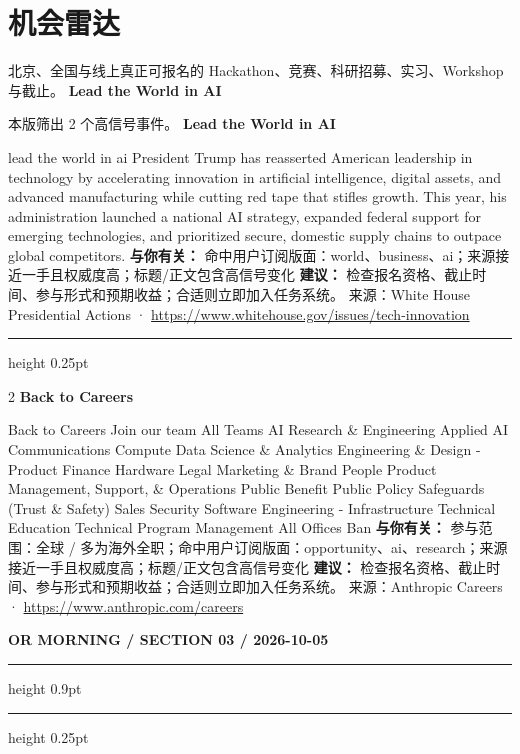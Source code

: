\documentclass[10.5pt]{ctexart}
\begin{document}
\section*{机会雷达}
{\color{ormuted} 北京、全国与线上真正可报名的 Hackathon、竞赛、科研招募、实习、Workshop 与截止。}
\vspace{2mm}
{\LARGE\bfseries Lead the World in AI}\par
\vspace{1mm}
{\color{ormuted} 本版筛出 2 个高信号事件。}
\vspace{3mm}
{\Large\bfseries Lead the World in AI}\par
lead the world in ai President Trump has reasserted American leadership in technology by accelerating innovation in artificial intelligence, digital assets, and advanced manufacturing while cutting red tape that stifles growth. This year, his administration launched a national AI strategy, expanded federal support for emerging technologies, and prioritized secure, domestic supply chains to outpace global competitors.
\textbf{与你有关：} 命中用户订阅版面：world、business、ai；来源接近一手且权威度高；标题/正文包含高信号变化
\textbf{建议：} 检查报名资格、截止时间、参与形式和预期收益；合适则立即加入任务系统。
{\footnotesize\color{ormuted} 来源：White House Presidential Actions · \url{https://www.whitehouse.gov/issues/tech-innovation}}
\vspace{4mm}
\hrule height 0.25pt
\vspace{3mm}
\begin{multicols}{2}
{\large\bfseries Back to Careers}\par
Back to Careers Join our team All Teams AI Research \& Engineering Applied AI Communications Compute Data Science \& Analytics Engineering \& Design - Product Finance Hardware Legal Marketing \& Brand People Product Management, Support, \& Operations Public Benefit Public Policy Safeguards (Trust \& Safety) Sales Security Software Engineering - Infrastructure Technical Education Technical Program Management All Offices Ban
\textbf{与你有关：} 参与范围：全球 / 多为海外全职；命中用户订阅版面：opportunity、ai、research；来源接近一手且权威度高；标题/正文包含高信号变化
\textbf{建议：} 检查报名资格、截止时间、参与形式和预期收益；合适则立即加入任务系统。
{\footnotesize\color{ormuted} 来源：Anthropic Careers · \url{https://www.anthropic.com/careers}}
\end{multicols}
\newpage
{\small\bfseries OR MORNING / SECTION 03 / 2026-10-05}
\vspace{2mm}
\hrule height 0.9pt
\vspace{1.5mm}
\hrule height 0.25pt
\vspace{4mm}
\end{document}
